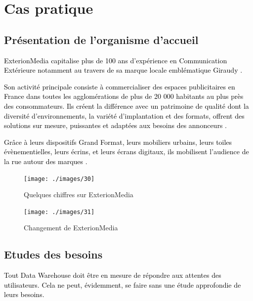 \documentclass[a4paper,12pt]{report}
\begin{document}
\newpage 


\chapter{Cas pratique}
\section{Présentation de l’organisme d’accueil }
\textcolor{black}{ExterionMedia capitalise plus de 100 ans d’expérience en Communication Extérieure notamment au travers de sa marque locale emblématique Giraudy \citep{Exterion}.}

\textcolor{black}{Son activité principale consiste à commercialiser des espaces publicitaires en France dans toutes les agglomérations de plus de 20 000 habitants au plus près des consommateurs. Ils créent la différence avec un patrimoine de qualité dont la diversité d’environnements, la variété d’implantation et des formats, offrent des solutions sur mesure, puissantes et adaptées aux besoins des annonceurs \citep{Exterion}.}

\textcolor{black}{Grâce à leurs dispositifs Grand Format, leurs mobiliers urbains, leurs toiles évènementielles, leurs écrins, et leurs écrans digitaux, ils mobilisent l’audience de la rue autour des marques \citep{Exterion}.}


\begin{figure}[H]

\begin{center}
\texttt{[image: ./images/30]}
\end{center}

\caption{Quelques chiffres sur ExterionMedia \citep{Exterion}}
\label{fig:1}

\end{figure}

\begin{figure}[H]

\begin{center}
\texttt{[image: ./images/31]}
\end{center}

\caption{Changement de ExterionMedia \citep{Exterion}}
\label{fig:1}

\end{figure}


\section{Etudes des besoins }
\textcolor{black}{Tout Data Warehouse doit être en mesure de répondre aux attentes des utilisateurs.
Cela ne peut, évidemment, se faire sans une étude approfondie de leurs besoins. }
\end{document}
